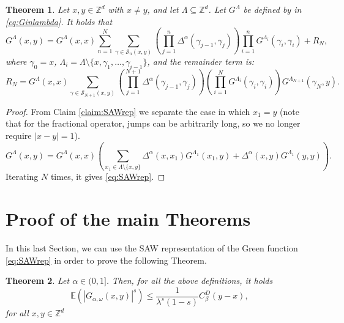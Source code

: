 \documentclass[11pt, a4paper, UKenglish, oneside]{book}
\theoremstyle{plain}
\newtheorem{theorem}{Theorem}
\theoremstyle{remark}
\theoremstyle{definition}
\numberwithin{equation}{section}
\numberwithin{theorem}{section}
\begin{document}
\begin{theorem}\label{thm:ultimaterepsaw}
Let $x, y \in \mathbb{Z}^d$ with $x \neq y$, and let $\Lambda \subseteq \mathbb{Z}^d$. Let $G^\Lambda$ be defined by in \eqref{eq:Ginlambda}. It holds that
\begin{equation}
    G^\Lambda(x, y) = G^\Lambda(x, x) \sum_{n=1}^N \sum_{\gamma \in \mathcal{S}_n(x, y)} \left( \prod_{j=1}^n \Delta^\alpha(\gamma_{j-1}, \gamma_j) \right) \prod_{i=1}^n G^{\Lambda_i}(\gamma_i, \gamma_i) + R_N, \label{eq:SAWrep} 
\end{equation}
where $\gamma_0 = x$, $\Lambda_i = \Lambda \setminus \{x, \gamma_1, \dots, \gamma_{i-1}\}$, and the remainder term is:
\begin{equation}
    R_N = G^\Lambda(x, x) \sum_{\gamma \in \mathcal{S}_{N+1}(x, y)} \left( \prod_{j=1}^{N+1} \Delta^\alpha(\gamma_{j-1}, \gamma_j) \right) \left( \prod_{i=1}^{N} G^{\Lambda_i}(\gamma_i, \gamma_i) \right) G^{\Lambda_{N+1}}(\gamma_N, y).    
\end{equation}
\end{theorem}
\begin{proof}
From Claim \ref{claim:SAWrep} we separate the case in which $x_1 = y$ (note that for the fractional operator, jumps can be arbitrarily long, so we no longer require $|x-y|=1$).
\[
G^\Lambda(x, y) = G^\Lambda(x, x) \left(\sum_{x_1 \in \Lambda \setminus \{x, y\}} \Delta^\alpha(x, x_1) G^{\Lambda_1}(x_1, y) + \Delta^\alpha(x, y) G^{\Lambda_1}(y,y)\right).
\]
Iterating $N$ times, it gives \eqref{eq:SAWrep}.
\end{proof}


\section{Proof of the main Theorems}\label{subsec:Proofwithsaw}
In this last Section, we can use the SAW representation of the Green function \eqref{eq:SAWrep} in order to prove the following Theorem.
\begin{theorem}
    Let $\alpha \in (0,1]$. Then, for all the above definitions, it holds 
    \begin{equation}
        \mathbb{E}(|G_{\alpha,\omega}(x,y)|^s)\le\frac{1}{\lambda^{s}(1-s)}C_{\beta}^{D}(y-x),
    \end{equation}  
    for all $x,y \in \mathbb{Z}^d$
\end{theorem}
\end{document}
